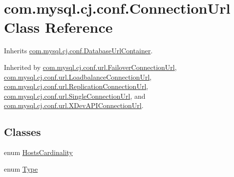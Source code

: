 \hypertarget{classcom_1_1mysql_1_1cj_1_1conf_1_1_connection_url}{}\section{com.\+mysql.\+cj.\+conf.\+Connection\+Url Class Reference}
\label{classcom_1_1mysql_1_1cj_1_1conf_1_1_connection_url}


Inherits \mbox{\hyperlink{interfacecom_1_1mysql_1_1cj_1_1conf_1_1_database_url_container}{com.\+mysql.\+cj.\+conf.\+Database\+Url\+Container}}.



Inherited by \mbox{\hyperlink{classcom_1_1mysql_1_1cj_1_1conf_1_1url_1_1_failover_connection_url}{com.\+mysql.\+cj.\+conf.\+url.\+Failover\+Connection\+Url}}, \mbox{\hyperlink{classcom_1_1mysql_1_1cj_1_1conf_1_1url_1_1_loadbalance_connection_url}{com.\+mysql.\+cj.\+conf.\+url.\+Loadbalance\+Connection\+Url}}, \mbox{\hyperlink{classcom_1_1mysql_1_1cj_1_1conf_1_1url_1_1_replication_connection_url}{com.\+mysql.\+cj.\+conf.\+url.\+Replication\+Connection\+Url}}, \mbox{\hyperlink{classcom_1_1mysql_1_1cj_1_1conf_1_1url_1_1_single_connection_url}{com.\+mysql.\+cj.\+conf.\+url.\+Single\+Connection\+Url}}, and \mbox{\hyperlink{classcom_1_1mysql_1_1cj_1_1conf_1_1url_1_1_x_dev_a_p_i_connection_url}{com.\+mysql.\+cj.\+conf.\+url.\+X\+Dev\+A\+P\+I\+Connection\+Url}}.

\subsection*{Classes}
\begin{DoxyCompactItemize}
\item 
enum \mbox{\hyperlink{enumcom_1_1mysql_1_1cj_1_1conf_1_1_connection_url_1_1_hosts_cardinality}{Hosts\+Cardinality}}
\item 
enum \mbox{\hyperlink{enumcom_1_1mysql_1_1cj_1_1conf_1_1_connection_url_1_1_type}{Type}}
\end{DoxyCompactItemize}
